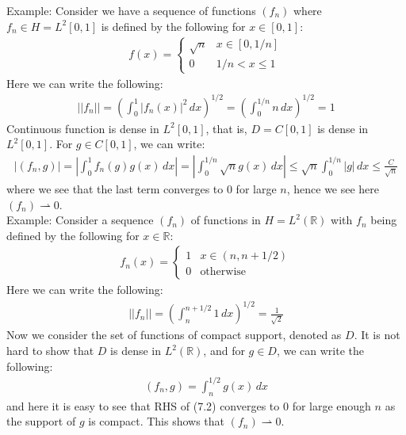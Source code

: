 \documentclass[11pt]{book}
\theoremstyle{break}
\theoremstyle{break}
\newcommand{\R}{\mathbb{R}}
\newcommand{\warow}{\rightharpoonup}
\newcommand{\example}{\color{green}Example: \color{black}}
\begin{document}
\example Consider we have a sequence of functions $(f_n)$ where $f_n \in H=L^2[0,1]$ is defined by the following for $x \in [0,1]$:
\begin{align*}
f(x) = \begin{cases}
\sqrt{n} & x \in [0,1/n]\\
0 & 1/n<x \leq 1
\end{cases}
\end{align*}
Here we can write the following:
\begin{align*}
||f_n|| = \left( \int_0^1 |f_n(x)|^2 \, dx\right)^{1/2} = \left( \int_0^{1/n} n \, dx\right)^{1/2} = 1
\end{align*}
Continuous function is dense in $L^2[0,1]$, that is, $D = C[0,1]$ is dense in $L^2[0,1]$. For $g \in C[0,1]$, we can write:
\begin{align*}
|(f_n,g)| = \left| \int_0^1 f_n(g) g(x) \, dx \right| = \left| \int_0^{1/n}\sqrt{n}g(x) \, dx \right| \leq \sqrt{n}\int_0^{1/n}|g| \, dx \leq \frac{C}{\sqrt{n}} 
\end{align*}
where we see that the last term converges to $0$ for large $n$, hence we see here $(f_n) \warow 0$.\\


\example
Consider a sequence $(f_n)$ of functions in $H = L^2(\R)$ with $f_n$ being defined by the following for $x \in \R$:
\begin{align*}
f_n(x) = \begin{cases} 1 & x \in (n, n+1/2) \\ 0 & \text{otherwise}\end{cases}
\end{align*}
Here we can write the following:
\begin{align*}
||f_n|| = \left( \int_n^{n+1/2}1\, dx \right)^{1/2} = \frac{1}{\sqrt{2}}
\end{align*}
Now we consider the set of functions of compact support, denoted as $D$. It is not hard to show that $D$ is dense in $L^2(\R)$, and for $g \in D$, we can write the following:
\begin{align}
(f_n, g) = \int_{n}^{1/2} g(x) \, dx 
\end{align}
and here it is easy to see that RHS of (7.2) converges to $0$ for large enough $n$ as the support of $g$ is compact. This shows that $(f_n) \warow 0$. 
\end{document}
